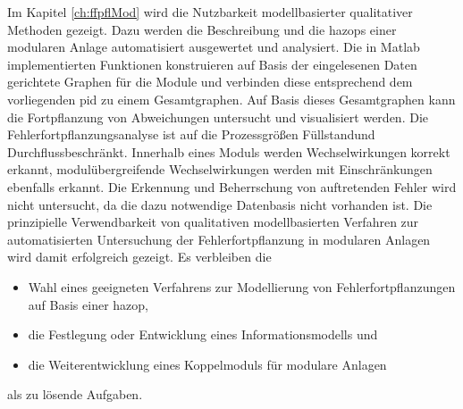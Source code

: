 Im Kapitel \ref{ch:ffpflMod} wird die Nutzbarkeit modellbasierter qualitativer Methoden gezeigt. Dazu werden die Beschreibung und die \acp{hazop} einer modularen Anlage automatisiert ausgewertet und analysiert. Die in Matlab implementierten Funktionen konstruieren auf Basis der eingelesenen Daten gerichtete Graphen f\"ur die Module und verbinden diese entsprechend dem vorliegenden \ac{pid} zu einem Gesamtgraphen. Auf Basis dieses Gesamtgraphen kann die Fortpflanzung von Abweichungen untersucht und visualisiert werden. Die Fehlerfortpflanzungsanalyse ist auf die Prozessgr\"o\ss{}en \glqq F\"ullstand\grqq { }und \glqq Durchfluss\grqq { }beschr\"ankt. Innerhalb eines Moduls werden Wechselwirkungen korrekt erkannt, modul\"ubergreifende Wechselwirkungen werden mit Einschr\"ankungen ebenfalls erkannt. Die Erkennung und Beherrschung von auftretenden Fehler wird nicht untersucht, da die dazu notwendige Datenbasis nicht vorhanden ist. \newline
Die prinzipielle Verwendbarkeit von qualitativen modellbasierten Verfahren zur automatisierten Untersuchung der Fehlerfortpflanzung in modularen Anlagen wird damit erfolgreich gezeigt. Es verbleiben die \begin{itemize}
\item Wahl eines geeigneten Verfahrens zur Modellierung von Fehlerfortpflanzungen auf Basis einer \ac{hazop},
\item die Festlegung oder Entwicklung eines Informationsmodells und
\item die Weiterentwicklung eines Koppelmoduls f\"ur modulare Anlagen
\end{itemize} als zu l\"osende Aufgaben.

